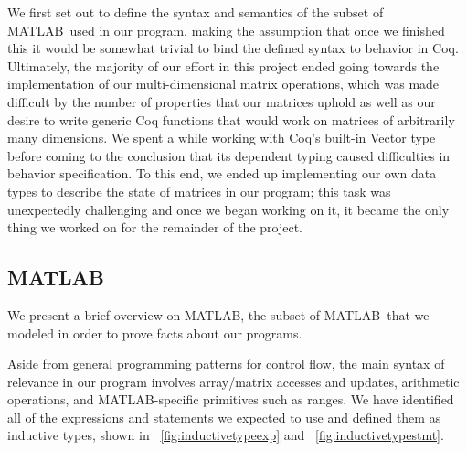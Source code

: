 \documentclass[11pt,conference]{IEEEtran}
\newcommand{\matlab}{MATLAB}
\newcommand{\mmatlab}{\textmu\matlab}
\theoremstyle{plain} %
\theoremstyle{definition}
\theoremstyle{remark}
\begin{document}
We first set out to define the syntax and semantics of the subset of \matlab\
used in our program, making the assumption that once we finished this it would
be somewhat trivial to bind the defined syntax to behavior in Coq. Ultimately,
the majority of our effort in this project ended going towards the
implementation of our multi-dimensional matrix operations, which was made
difficult by the number of properties that our matrices uphold as well as our
desire to write generic Coq functions that would work on matrices of arbitrarily
many dimensions. We spent a while working with Coq's built-in \textsf{Vector}
type before coming to the conclusion that its dependent typing caused
difficulties in behavior specification. To this end, we ended up implementing
our own data types to describe the state of matrices in our program; this task
was unexpectedly challenging and once we began working on it, it became the only
thing we worked on for the remainder of the project.

\subsection{\mmatlab}\label{S:mmatlab}

We present a brief overview on \mmatlab, the subset of \matlab\ that we modeled in
order to prove facts about our programs.

Aside from general programming patterns for control flow, the main syntax of
relevance in our program involves array/matrix accesses and updates, arithmetic
operations, and \matlab-specific primitives such as ranges. We have identified
all of the expressions and statements we expected to use and defined them as
inductive types, shown in \figurename~\ref{fig:inductivetypeexp} and
\figurename~\ref{fig:inductivetypestmt}.
\end{document}
